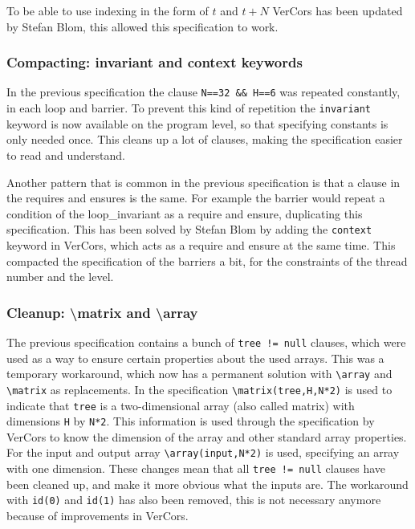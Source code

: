 \documentclass[a4paper]{article}
\newcommand{\code}[1]{\texttt{\small \color{inline}#1}} %
\begin{document}
To be able to use indexing in the form of $t$ and $t+N$ VerCors has been updated by Stefan Blom, this allowed this specification to work.

\subsubsection{Compacting: invariant and context keywords}
In the previous specification the clause \code{N==32 \&\& H==6} was repeated constantly, in each loop and barrier. To prevent this kind of repetition the \code{invariant} keyword is now available on the program level, so that specifying constants is only needed once. This cleans up a lot of clauses, making the specification easier to read and understand.

Another pattern that is common in the previous specification is that a clause in the requires and ensures is the same. For example the barrier would repeat a condition of the loop\_invariant as a require and ensure, duplicating this specification. This has been solved by Stefan Blom by adding the \code{context} keyword in VerCors, which acts as a require and ensure at the same time. This compacted the specification of the barriers a bit, for the constraints of the thread number and the level.

\subsubsection{Cleanup: \textbackslash matrix and \textbackslash array}
The previous specification contains a bunch of \code{tree != null} clauses, which were used as a way to ensure certain properties about the used arrays. This was a temporary workaround, which now has a permanent solution with \code{\textbackslash array} and \code{\textbackslash matrix} as replacements. In the specification \code{\textbackslash matrix(tree,H,N*2)} is used to indicate that \code{tree} is a two-dimensional array (also called matrix) with dimensions \code{H} by \code{N*2}. This information is used through the specification by VerCors to know the dimension of the array and other standard array properties. For the input and output array \code{\textbackslash array(input,N*2)} is used, specifying an array with one dimension. These changes mean that all \code{tree != null} clauses have been cleaned up, and make it more obvious what the inputs are. The workaround with \code{id(0)} and \code{id(1)} has also been removed, this is not necessary anymore because of improvements in VerCors.
\end{document}

